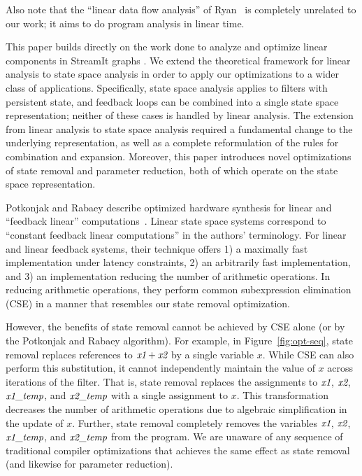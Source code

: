 Also note that the ``linear data flow analysis'' of Ryan~\cite{ryan92}
is completely unrelated to our work; it aims to do program analysis in
linear time.


This paper builds directly on the work done to analyze and optimize
linear components in StreamIt graphs \cite{Lamb}. We extend the
theoretical framework for linear analysis to state space analysis in
order to apply our optimizations to a wider class of applications.
Specifically, state space analysis applies to filters with persistent
state, and feedback loops can be combined into a single state space
representation; neither of these cases is handled by linear analysis.
The extension from linear analysis to state space analysis required a
fundamental change to the underlying representation, as well as a
complete reformulation of the rules for combination and expansion.
Moreover, this paper introduces novel optimizations of state removal
and parameter reduction, both of which operate on the state space
representation.

Potkonjak and Rabaey describe optimized hardware synthesis for linear
and ``feedback linear'' computations~\cite{Potkonjak00}.  Linear state
space systems correspond to ``constant feedback linear computations''
in the authors' terminology.  For linear and linear feedback systems,
their technique offers 1) a maximally fast implementation under
latency constraints, 2) an arbitrarily fast implementation, and 3) an
implementation reducing the number of arithmetic operations.  In
reducing arithmetic operations, they perform common subexpression
elimination (CSE) in a manner that resembles our state removal
optimization.

However, the benefits of state removal cannot be achieved by CSE alone
(or by the Potkonjak and Rabaey algorithm).  For example, in
Figure~\ref{fig:opt-seq}, state removal replaces references to
$\mbox{\it x1} + \mbox{\it x2}$ by a single variable $x$.  While CSE can also
perform this substitution, it cannot independently maintain the value
of $x$ across iterations of the filter.  That is, state removal
replaces the assignments to $\mbox{\it x1}$, $\mbox{\it x2}$,
$\mbox{\it x1}\_{\mbox{\it temp}}$, and $\mbox{\it x2}\_{\mbox{\it temp}}$ with a single
assignment to $x$.  This transformation decreases the number of
arithmetic operations due to algebraic simplification in the update of
$x$.  Further, state removal completely removes the variables
$\mbox{\it x1}$, $\mbox{\it x2}$, $\mbox{\it x1}\_{\mbox{\it temp}}$, and
$\mbox{\it x2}\_{\mbox{\it temp}}$ from the program.  We are unaware of any
sequence of traditional compiler optimizations that achieves the same
effect as state removal (and likewise for parameter reduction).

